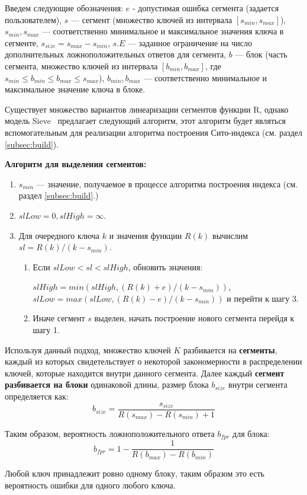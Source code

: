 Введем следующие обозначения:
$e$ - допустимая ошибка сегмента (задается пользователем), $s$ --- сегмент (множество ключей из интервала $[s_{min}, s_{max}]$), $s_{min}, s_{max}$ --- соответственно минимальное и максимальное значения ключа в сегменте, $s_{size} = s_{max} - s_{min}$, $s.E$ --- заданное ограничение на число дополнительных ложноположительных ответов для сегмента, $b$ --- блок (часть сегмента, множество ключей из интервала $[b_{min}, b_{max}]$, где $s_{min} \leq b_{min} \leq b_{max} \leq s_{max}$), $b_{min}, b_{max}$ --- соответственно минимальное и максимальное значение ключа в блоке.

Существует множество вариантов линеаризации сегментов функции R, однако модель Sieve~\cite{Sieve} предлагает следующий алгоритм, этот алгоритм будет являться вспомогательным для реализации алгоритма построения Сито-индекса (см. раздел \ref{subsec:build}).

\textbf{Алгоритм для выделения сегментов:}
\begin{enumerate}
\item $s_{min}$ --- значение, получаемое в процессе алгоритма построения индекса (см. раздел \ref{subsec:build}.)
\item $slLow = 0, slHigh = \infty$.
\item Для очередного ключа $k$ и значения функции $R(k)$ вычислим \mbox{$sl = R(k) / (k - s_{min})$}.
    \begin{enumerate}
    \item Если \mbox{$slLow < sl < slHigh$}, обновить значения:
    
    \mbox{$slHigh = min(slHigh, (R(k) + e) / (k - s_{min}))$}, \mbox{$slLow = max(slLow, (R(k) - e) / (k - s_{min}))$} и перейти к шагу 3.
    \item Иначе сегмент $s$ выделен, начать построение нового сегмента перейдя к шагу 1.
    \end{enumerate}
\end{enumerate}

Используя данный подход, множество ключей $K$ разбивается на \textbf{сегменты}, каждый из которых свидетельствует о некоторой закономерности в распределении ключей, которые находится внутри данного сегмента. Далее каждый \textbf{сегмент разбивается на блоки} одинаковой длины, размер блока $b_{size}$ внутри сегмента определяется как:
\begin{equation}\label{eq:partition_size}
    b_{size} = \frac{s_{size}}{R(s_{max}) - R(s_{min}) + 1}
\end{equation}

Таким образом, вероятность ложноположительного ответа $b_{fpr}$ для блока:
\begin{equation}\label{eq:partition_fpr}
    b_{fpr} = 1 - \frac{1}{R(b_{max}) - R(b_{min})}
\end{equation}

Любой ключ принадлежит ровно одному блоку, таким образом это есть вероятность ошибки для одного любого ключа.
